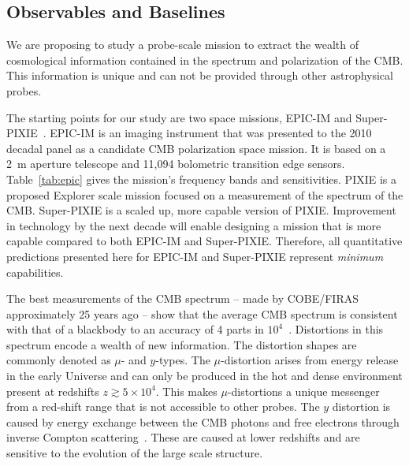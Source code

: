 
\subsection{Observables and Baselines}
\label{sec:observables}

\vspace{-0.05in}

We are proposing to study a probe-scale mission to extract the wealth 
of cosmological information contained in the spectrum and polarization of the \ac{CMB}. This information is unique
and can not be provided through other astrophysical probes.  

The starting points for our study are two space missions, EPIC-IM and Super-PIXIE~\cite{epic_im,pixie}. EPIC-IM is 
an imaging instrument that was presented 
to the 2010 decadal panel as a candidate \ac{CMB} polarization space mission. It is based on a 2~m aperture telescope 
and 11,094 bolometric transition edge sensors. Table~\ref{tab:epic} gives the mission's frequency bands and sensitivities. 
PIXIE is a proposed Explorer scale mission focused on a measurement of the spectrum of the CMB. Super-PIXIE is a scaled up, 
more capable version of PIXIE. Improvement in technology by the next decade will enable designing a mission 
that is more capable compared to both EPIC-IM and Super-PIXIE. Therefore, all quantitative predictions presented here
for EPIC-IM and Super-PIXIE represent {\it minimum} capabilities. 

The best measurements of the \ac{CMB} spectrum -- made by COBE/FIRAS approximately 25 years ago --
show that the average CMB spectrum is consistent with that of a blackbody to an accuracy of 4 parts 
in $10^{4}$~\cite{Mather1994, Fixsen1996}. Distortions in this spectrum encode a wealth of new information.
The distortion shapes are commonly denoted as $\mu$- and $y$-types. The 
$\mu$-distortion arises from energy release in the early Universe and can only be produced in the hot and dense 
environment present at redshifts $z\gtrsim 5\times10^4$. This makes $\mu$-distortions a unique messenger from a red-shift 
range that is not accessible to other probes. The $y$ distortion is caused by 
energy exchange between the \ac{CMB} photons and free electrons through inverse Compton 
scattering~\cite{Zeldovich1969, Sunyaev1970mu}. These are caused at lower redshifts and are sensitive to the 
evolution of the large scale structure. 

